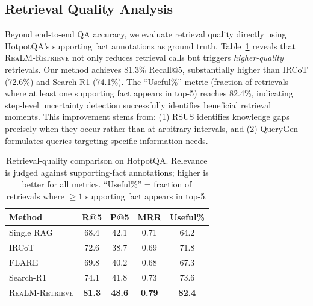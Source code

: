 \documentclass[sigconf,natbib=true]{acmart}
\newcommand{\methodname}{\textsc{ReaLM-Retrieve}}
\begin{document}
\subsection{Retrieval Quality Analysis}
Beyond end-to-end QA accuracy, we evaluate retrieval quality directly using HotpotQA's supporting fact annotations as ground truth. Table~\ref{tab:retrieval_quality} reveals that \methodname{} not only reduces retrieval calls but triggers \emph{higher-quality} retrievals. Our method achieves 81.3\% Recall@5, substantially higher than IRCoT (72.6\%) and Search-R1 (74.1\%). The ``Useful\%'' metric (fraction of retrievals where at least one supporting fact appears in top-5) reaches 82.4\%, indicating step-level uncertainty detection successfully identifies beneficial retrieval moments. This improvement stems from: (1) RSUS identifies knowledge gaps precisely when they occur rather than at arbitrary intervals, and (2) QueryGen formulates queries targeting specific information needs.

\begin{table}[t]
\small
\centering
\caption{Retrieval-quality comparison on HotpotQA. Relevance is judged against supporting-fact annotations; higher is better for all metrics. ``Useful\%'' = fraction of retrievals where $\ge 1$ supporting fact appears in top-5.}
\label{tab:retrieval_quality}
\begin{tabular}{@{}l|cccc@{}}
\toprule
\textbf{Method} & \textbf{R@5} & \textbf{P@5} & \textbf{MRR} & \textbf{Useful\%} \\
\midrule
Single RAG & 68.4 & 42.1 & 0.71 & 64.2 \\
IRCoT & 72.6 & 38.7 & 0.69 & 71.8 \\
FLARE & 69.8 & 40.2 & 0.68 & 67.3 \\
Search-R1 & 74.1 & 41.8 & 0.73 & 73.6 \\
\methodname{} & \textbf{81.3} & \textbf{48.6} & \textbf{0.79} & \textbf{82.4} \\
\bottomrule
\end{tabular}
\end{table}
\end{document}
